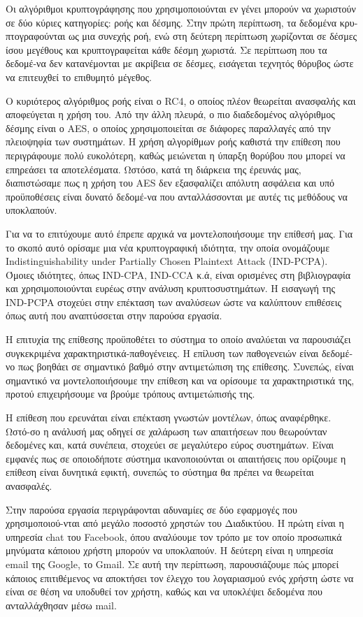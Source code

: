 Οι αλγόριθμοι κρυπτογράφησης που χρησιμοποιούνται εν γένει μπορούν να χωριστούν
σε δύο κύριες κατηγορίες: ροής και δέσμης. Στην πρώτη περίπτωση, τα δεδομένα
κρυ-πτογραφούνται ως μια συνεχής ροή, ενώ στη δεύτερη περίπτωση χωρίζονται σε
δέσμες ίσου μεγέθους και κρυπτογραφείται κάθε δέσμη χωριστά. Σε περίπτωση που τα
δεδομέ-να δεν κατανέμονται με ακρίβεια σε δέσμες, εισάγεται τεχνητός θόρυβος
ώστε να επιτευχθεί το επιθυμητό μέγεθος.

Ο κυριότερος αλγόριθμος ροής είναι ο RC4, ο οποίος πλέον θεωρείται ανασφαλής και
αποφεύγεται η χρήση του. Από την άλλη πλευρά, ο πιο διαδεδομένος αλγόριθμος
δέσμης είναι ο AES, ο οποίος χρησιμοποιείται σε διάφορες παραλλαγές από την
πλειοψηφία των συστημάτων. Η χρήση αλγορίθμων ροής καθιστά την επίθεση που
περιγράφουμε πολύ ευκολότερη, καθώς μειώνεται η ύπαρξη θορύβου που μπορεί να
επηρεάσει τα αποτελέσματα. Ωστόσο, κατά τη διάρκεια της έρευνάς μας, διαπιστώσαμε πως η
χρήση του AES δεν εξασφαλίζει απόλυτη ασφάλεια και υπό προϋποθέσεις είναι δυνατό
δεδομέ-να που ανταλλάσσονται με αυτές τις μεθόδους να υποκλαπούν.

Για να το επιτύχουμε αυτό έπρεπε αρχικά να μοντελοποιήσουμε την επίθεσή μας. Για
το σκοπό αυτό ορίσαμε μια νέα κρυπτογραφική ιδιότητα, την οποία ονομάζουμε
Indistinguishability under Partially Chosen Plaintext Attack (IND-PCPA). Όμοιες
ιδιότητες, όπως IND-CPA, IND-CCA κ.ά, είναι ορισμένες στη βιβλιογραφία και
χρησιμοποιούνται ευρέως στην ανάλυση κρυπτοσυστημάτων. Η εισαγωγή της IND-PCPA
στοχεύει στην επέκταση των αναλύσεων ώστε να καλύπτουν επιθέσεις όπως αυτή που
αναπτύσσεται στην παρούσα εργασία.

Η επιτυχία της επίθεσης προϋποθέτει το σύστημα το οποίο αναλύεται να παρουσιάζει
συγκεκριμένα χαρακτηριστικά-παθογένειες. Η επίλυση των παθογενειών είναι
δεδομέ-νο πως βοηθάει σε σημαντικό βαθμό στην αντιμετώπιση της επίθεσης. Συνεπώς,
είναι σημαντικό να μοντελοποιήσουμε την επίθεση και να ορίσουμε τα
χαρακτηριστικά της, προτού επιχειρήσουμε να βρούμε τρόπους αντιμετώπισής της.

Η επίθεση που ερευνάται είναι επέκταση γνωστών μοντέλων, όπως αναφέρθηκε. Ωστό-σο
η ανάλυσή μας οδηγεί σε χαλάρωση των απαιτήσεων που θεωρούνταν δεδομένες και,
κατά συνέπεια, στοχεύει σε μεγαλύτερο εύρος συστημάτων. Είναι εμφανές πως
σε οποιοδήποτε σύστημα ικανοποιούνται οι απαιτήσεις που ορίζουμε η επίθεση είναι
δυνητικά εφικτή, συνεπώς το σύστημα θα πρέπει να θεωρείται ανασφαλές.

Στην παρούσα εργασία περιγράφονται αδυναμίες σε δύο εφαρμογές που
χρησιμοποιού-νται από μεγάλο ποσοστό χρηστών του Διαδικτύου. Η πρώτη είναι η
υπηρεσία chat του Facebook, όπου αναλύουμε τον τρόπο με τον οποίο προσωπικά
μηνύματα κάποιου χρήστη μπορούν να υποκλαπούν. Η δεύτερη είναι η υπηρεσία email
της Google, το Gmail. Σε αυτή την περίπτωση, παρουσιάζουμε πώς μπορεί κάποιος
επιτιθέμενος να αποκτήσει τον έλεγχο του λογαριασμού ενός χρήστη ώστε να είναι
σε θέση να υποδυθεί τον χρήστη, καθώς και να υποκλέψει δεδομένα που
ανταλλάχθησαν μέσω mail.

